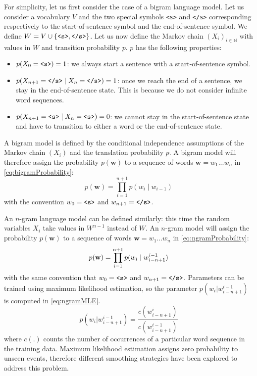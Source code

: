 For simplicity, let us first consider the case of a bigram language model.
Let us consider a vocabulary $V$ and the two special symbols \texttt{<s>} and \texttt{</s>}
corresponding respectively to the start-of-sentence symbol and the
end-of-sentence symbol. We define
$W = V \cup \{\text{\texttt{<s>}}, \text{\texttt{</s>}}\}$. Let us now define
the Markov chain $(X_i)_{i \in \mathbb{N}}$ with values in $W$ and transition
probability $p$. $p$ has the following properties:
%
\begin{itemize}
  \item $p(X_0 = \text{\texttt{<s>}}) = 1$: we always start a sentence with a start-of-sentence
    symbol.
  \item $p(X_{n + 1} = \text{\texttt{</s>}} \mid X_n = \text{\texttt{</s>}}) = 1$: once we reach the end of a
    sentence, we stay in the end-of-sentence state. This is because we do not
    consider infinite word sequences.
  \item $p(X_{n + 1} = \text{\texttt{<s>}} \mid X_n = \text{\texttt{<s>}}) = 0$: we cannot stay in the
    start-of-sentence state and have to transition to either a word or the
    end-of-sentence state.
\end{itemize}
%
A bigram model is defined by the conditional independence assumptions of the
Markov chain $(X_i)$ and the translation probability $p$. A bigram model will
therefore assign the probability $p(\bm{w})$ to a sequence of words
$\bm{w} = w_1...w_n$ in \autoref{eq:bigramProbability}:
%
\begin{equation}
  p(\bm{w}) = \prod_{i = 1}^{n+1} p(w_i \mid w_{i - 1})
  \label{eq:bigramProbability}
\end{equation}
%
with the convention $w_0 = \text{\texttt{<s>}}$ and $w_{n+1} = \text{\texttt{</s>}}$.

An $n$-gram language model can be defined similarly: this time the random
variables $X_i$ take values in $W^{n - 1}$ instead of $W$. An $n$-gram model %
will assign the probability $p(\bm{w})$ to a sequence of words
$\bm{w} = w_1...w_n$ in \autoref{eq:ngramProbability}:
%
\begin{equation}
  p({\bf w}) = \prod_{i=1}^{n + 1} p(w_i \mid w_{i-n+1}^{i-1})
  \label{eq:ngramProbability}
\end{equation}
%
with the same convention that $w_0 = \text{\texttt{<s>}}$
and $w_{n+1} = \text{\texttt{</s>}}$.
Parameters can be trained using maximum likelihood estimation, so the parameter
$p(w_i|w_{i-n+1}^{i-1})$ is computed in \autoref{eq:ngramMLE}.
%
\begin{equation}
  p(w_i|w_{i-n+1}^{i-1}) = \frac{c(w_{i-n+1}^{i})}{c(w_{i-n+1}^{i-1})}
  \label{eq:ngramMLE}
\end{equation}
%
where $c(.)$ counts the number of occurrences of a particular word sequence in
the training data. Maximum likelihood estimation assigns zero probability to
unseen events, therefore different smoothing strategies have been explored to
address this problem.

